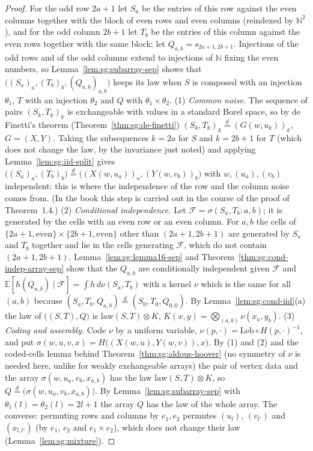 \begin{proof}
  \leanok
{}
For the odd row $2a+1$ let $S_a$ be the entries of this row against the even columns together with the block of even rows and even columns (reindexed by $\mathbb N^2$), and for the odd column $2b+1$ let $T_b$ be the entries of this column against the even rows together with the same block; let $Q_{a,b}=s_{2a+1,2b+1}$. Injections of the odd rows and of the odd columns extend to injections of $\mathbb N$ fixing the even numbers, so Lemma~\ref{lem:sg:subarray-sep} shows that $\big((S_a)_a,(T_b)_b,(Q_{a,b})_{a,b}\big)$ keeps its law when $S$ is composed with an injection $\theta_1$, $T$ with an injection $\theta_2$ and $Q$ with $\theta_1\times\theta_2$.
(1) \emph{Common noise.} The sequence of pairs $(S_k,T_k)_k$ is exchangeable with values in a standard Borel space, so by de Finetti's theorem (Theorem~\ref{thm:sg:de-finetti}) $(S_k,T_k)_k\overset d=(G(w,u_k))_k$, $G=(X,Y)$. Taking the subsequences $k=2a$ for $S$ and $k=2b+1$ for $T$ (which does not change the law, by the invariance just noted) and applying Lemma~\ref{lem:sg:iid-split} gives $\big((S_a)_a,(T_b)_b\big)\overset d=\big((X(w,u_a))_a,(Y(w,v_b))_b\big)$ with $w,(u_a),(v_b)$ independent: this is where the independence of the row and the column noise comes from. (In the book this step is carried out in the course of the proof of Theorem~1.4.)
(2) \emph{Conditional independence.} Let $\mathscr F=\sigma(S_a,T_b:a,b)$; it is generated by the cells with an even row or an even column. For $a,b$ the cells of $\{2a+1,\text{even}\}\times\{2b+1,\text{even}\}$ other than $(2a+1,2b+1)$ are generated by $S_a$ and $T_b$ together and lie in the cells generating $\mathscr F$, which do not contain $(2a+1,2b+1)$. Lemma~\ref{lem:sg:lemma16-sep} and Theorem~\ref{thm:sg:cond-indep-array-sep} show that the $Q_{a,b}$ are conditionally independent given $\mathscr F$ and $\mathbb E[h(Q_{a,b})\mid\mathscr F]=\int h\,d\nu(S_a,T_b)$ with a kernel $\nu$ which is the same for all $(a,b)$ because $(S_a,T_b,Q_{a,b})\overset d=(S_0,T_0,Q_{0,0})$. By Lemma~\ref{lem:sg:cond-iid}(a) the law of $\big((S,T),Q\big)$ is $\mathrm{law}(S,T)\otimes K$, $K(x,y)=\bigotimes_{(a,b)}\nu(x_a,y_b)$.
(3) \emph{Coding and assembly.} Code $\nu$ by a uniform variable, $\nu(p,\cdot)=\mathrm{Leb}\circ H(p,\cdot)^{-1}$, and put $\sigma(w,u,v,x)=H\big((X(w,u),Y(w,v)),x\big)$. By (1) and (2) and the coded-cells lemma behind Theorem~\ref{thm:sg:aldous-hoover} (no symmetry of $\nu$ is needed here, unlike for weakly exchangeable arrays) the pair of vertex data and the array $\sigma(w,u_a,v_b,x_{a,b})$ has the law $\mathrm{law}(S,T)\otimes K$, so $Q\overset d=\big(\sigma(w,u_a,v_b,x_{a,b})\big)$. By Lemma~\ref{lem:sg:subarray-sep} with $\theta_1(l)=\theta_2(l)=2l+1$ the array $Q$ has the law of the whole array.
The converse: permuting rows and columns by $e_1,e_2$ permutes $(u_l)$, $(v_{l'})$ and $(x_{l,l'})$ (by $e_1$, $e_2$ and $e_1\times e_2$), which does not change their law (Lemma~\ref{lem:sg:mixture}).
\end{proof}


